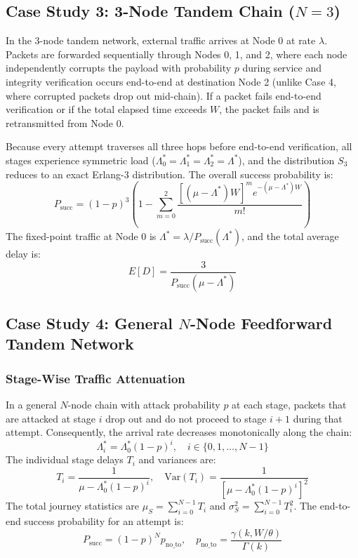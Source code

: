 \documentclass[journal,compsoc]{IEEEtran}
\begin{document}
\subsection{Case Study 3: 3-Node Tandem Chain (\texorpdfstring{$N=3$}{N=3})}
In the 3-node tandem network, external traffic arrives at Node 0 at rate $\lambda$. Packets are forwarded sequentially through Nodes 0, 1, and 2, where each node independently corrupts the payload with probability $p$ during service and integrity verification occurs end-to-end at destination Node 2 (unlike Case 4, where corrupted packets drop out mid-chain). If a packet fails end-to-end verification or if the total elapsed time exceeds $W$, the packet fails and is retransmitted from Node 0.

Because every attempt traverses all three hops before end-to-end verification, all stages experience symmetric load ($\Lambda_0^* = \Lambda_1^* = \Lambda_2^* = \Lambda^*$), and the distribution $S_3$ reduces to an exact Erlang-3 distribution. The overall success probability is:
\begin{equation}
P_{\text{succ}} = (1 - p)^3 \left(1 - \sum_{m=0}^2 \frac{[(\mu - \Lambda^*)W]^m e^{-(\mu - \Lambda^*)W}}{m!}\right)
\end{equation}
The fixed-point traffic at Node 0 is $\Lambda^* = \lambda / P_{\text{succ}}(\Lambda^*)$, and the total average delay is:
\begin{equation}
E[D] = \frac{3}{P_{\text{succ}}(\mu - \Lambda^*)}
\end{equation}

\subsection{Case Study 4: General \texorpdfstring{$N$}{N}-Node Feedforward Tandem Network}
\subsubsection{Stage-Wise Traffic Attenuation}
In a general $N$-node chain with attack probability $p$ at each stage, packets that are attacked at stage $i$ drop out and do not proceed to stage $i+1$ during that attempt. Consequently, the arrival rate decreases monotonically along the chain:
\begin{equation}
\Lambda_i^* = \Lambda_0^* (1 - p)^i, \quad i \in \{0, 1, \dots, N-1\}
\label{eq:tandem_attenuation}
\end{equation}
The individual stage delays $T_i$ and variances are:
\begin{equation}
T_i = \frac{1}{\mu - \Lambda_0^*(1 - p)^i}, \quad \text{Var}(T_i) = \frac{1}{[\mu - \Lambda_0^*(1 - p)^i]^2}
\end{equation}
The total journey statistics are $\mu_S = \sum_{i=0}^{N-1} T_i$ and $\sigma_S^2 = \sum_{i=0}^{N-1} T_i^2$. The end-to-end success probability for an attempt is:
\begin{equation}
P_{\text{succ}} = (1 - p)^N p_{\text{no\_to}}, \quad p_{\text{no\_to}} = \frac{\gamma(k, W/\theta)}{\Gamma(k)}
\end{equation}
\end{document}
